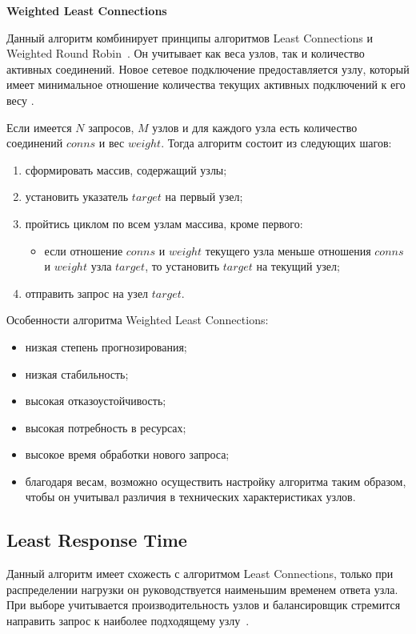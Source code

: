 \textbf{Weighted Least Connections}

Данный алгоритм комбинирует принципы алгоритмов Least Connections и Weighted Round Robin~\cite{part_algos}.
Он учитывает как веса узлов, так и количество активных соединений. 
Новое сетевое подключение предоставляется узлу, который имеет минимальное отношение количества текущих активных подключений к его весу \cite{mainsource}.

Если имеется $N$ запросов, $M$ узлов и для каждого узла есть количество соединений $conns$ и вес $weight$.
Тогда алгоритм состоит из следующих шагов:
\begin{enumerate}
	\item сформировать массив, содержащий узлы;
	\item установить указатель $target$ на первый узел;
	\item пройтись циклом по всем узлам массива, кроме первого:
	\begin{itemize}
	\item если отношение $conns$ и $weight$ текущего узла меньше отношения $conns$ и $weight$ узла $target$, то установить $target$ на текущий узел; 
	\end{itemize}
	\item отправить запрос на узел $target$.
\end{enumerate}

Особенности алгоритма Weighted Least Connections:
\begin{itemize}
	\item низкая степень прогнозирования; 
	\item низкая стабильность;
	\item высокая отказоустойчивость;
	\item высокая потребность в ресурсах;
	\item высокое время обработки нового запроса;
	\item благодаря весам, возможно осуществить настройку алгоритма таким образом, чтобы он учитывал различия в технических характеристиках узлов.
\end{itemize}


\subsection{Least Response Time}

Данный алгоритм имеет схожесть с алгоритмом Least Connections, только при распределении нагрузки он руководствуется наименьшим временем ответа узла.
При выборе учитывается производительность узлов и балансировщик стремится направить запрос к наиболее подходящему узлу~\cite{aws}.

